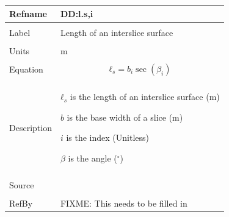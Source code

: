 \documentclass[12pt]{article}
\begin{document}
\noindent \begin{minipage}{\textwidth}
\begin{tabular}{p{} p{}}
\toprule \textbf{Refname} & \textbf{DD:l.s,i}
\label{DD:l.s,i}
\\ \midrule \\
Label & Length of an interslice surface
\\ \midrule \\
Units & m
\\ \midrule \\
Equation & \begin{dmath}
           {ℓ_{s}}=b_{i} \sec\left(β_{i}\right)
           \end{dmath}
\\ \midrule \\
Description & \begin{symbDescription}
              \item{${ℓ_{s}}$ is the length of an interslice surface (m)}
              \item{$b$ is the base width of a slice (m)}
              \item{$i$ is the index (Unitless)}
              \item{$β$ is the angle (${}^{\circ}$)}
              \end{symbDescription}
\\ \midrule \\
Source &
\\ \midrule \\
RefBy & FIXME: This needs to be filled in
\\ \bottomrule \end{tabular}
\end{minipage}\\
~\newline
\end{document}
